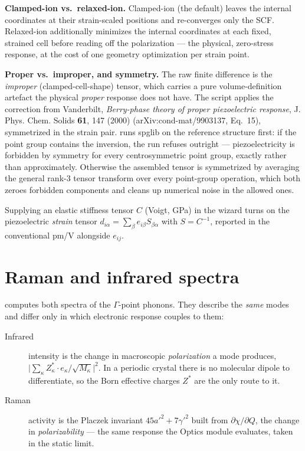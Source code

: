\textbf{Clamped-ion vs.\ relaxed-ion.} Clamped-ion (the default) leaves the
internal coordinates at their strain-scaled positions and re-converges only
the SCF. Relaxed-ion additionally minimizes the internal coordinates at each
fixed, strained cell before reading off the polarization --- the physical,
zero-stress response, at the cost of one geometry optimization per strain
point.

\textbf{Proper vs.\ improper, and symmetry.} The raw finite difference is the
\emph{improper} (clamped-cell-shape) tensor, which carries a pure
volume-definition artefact the physical \emph{proper} response does not
have. The script applies the correction from Vanderbilt, \emph{Berry-phase
theory of proper piezoelectric response}, J. Phys. Chem. Solids \textbf{61},
147 (2000) (arXiv:cond-mat/9903137, Eq.~15), symmetrized in the strain pair.
 runs spglib on the reference structure
first: if the point group contains the inversion, the run refuses outright
--- piezoelectricity is forbidden by symmetry for every centrosymmetric
point group, exactly rather than approximately. Otherwise the assembled
tensor is symmetrized by averaging the general rank-3 tensor transform over
every point-group operation, which both zeroes forbidden components and
cleans up numerical noise in the allowed ones.

Supplying an elastic stiffness tensor $C$ (Voigt, GPa) in the wizard turns
on the piezoelectric \emph{strain} tensor $d_{i\alpha} = \sum_\beta
e_{i\beta} S_{\beta\alpha}$ with $S = C^{-1}$, reported in the conventional
pm/V alongside $e_{ij}$.

\section{Raman and infrared spectra}
\label{sec:raman-ir}

\menusep{} computes both
spectra of the $\Gamma$-point phonons. They describe the \emph{same} modes and
differ only in which electronic response couples to them:

\begin{description}
  \item[Infrared] intensity is the change in macroscopic \emph{polarization} a
    mode produces, $\bigl|\sum_\kappa Z^*_\kappa \cdot
    e_\kappa/\sqrt{M_\kappa}\bigr|^2$. In a periodic crystal there is no
    molecular dipole to differentiate, so the Born effective charges $Z^*$ are
    the only route to it.
  \item[Raman] activity is the Placzek invariant $45a'^2 + 7\gamma'^2$ built
    from $\partial\chi/\partial Q$, the change in \emph{polarizability} --- the
    same response the Optics module evaluates, taken in the static limit.
\end{description}


